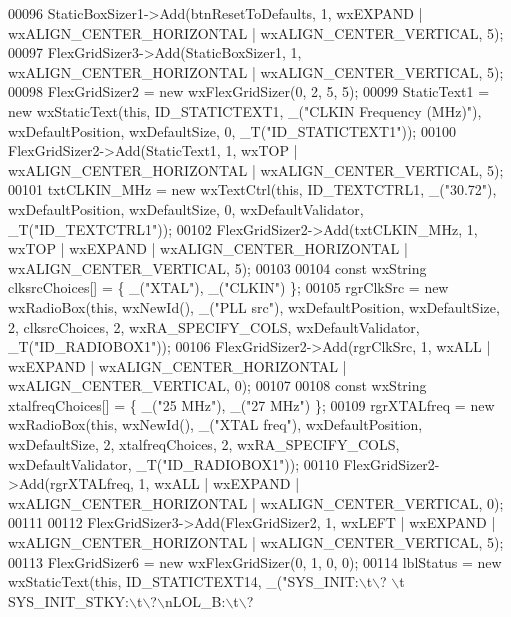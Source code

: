 \begin{DoxyCode}
00096     StaticBoxSizer1->Add(btnResetToDefaults, 1, wxEXPAND | wxALIGN\_CENTER\_HORIZONTAL | 
      wxALIGN\_CENTER\_VERTICAL, 5);
00097     FlexGridSizer3->Add(StaticBoxSizer1, 1, wxALIGN\_CENTER\_HORIZONTAL | wxALIGN\_CENTER\_VERTICAL, 5);
00098     FlexGridSizer2 = \textcolor{keyword}{new} wxFlexGridSizer(0, 2, 5, 5);
00099     StaticText1 = \textcolor{keyword}{new} wxStaticText(\textcolor{keyword}{this}, ID\_STATICTEXT1, \_(\textcolor{stringliteral}{"CLKIN Frequency (MHz)"}), wxDefaultPosition, 
      wxDefaultSize, 0, \_T(\textcolor{stringliteral}{"ID\_STATICTEXT1"}));
00100     FlexGridSizer2->Add(StaticText1, 1, wxTOP | wxALIGN\_CENTER\_HORIZONTAL | wxALIGN\_CENTER\_VERTICAL, 5);
00101     txtCLKIN\_MHz = \textcolor{keyword}{new} wxTextCtrl(\textcolor{keyword}{this}, ID\_TEXTCTRL1, \_(\textcolor{stringliteral}{"30.72"}), wxDefaultPosition, wxDefaultSize, 0, 
      wxDefaultValidator, \_T(\textcolor{stringliteral}{"ID\_TEXTCTRL1"}));
00102     FlexGridSizer2->Add(txtCLKIN\_MHz, 1, wxTOP | wxEXPAND | wxALIGN\_CENTER\_HORIZONTAL | 
      wxALIGN\_CENTER\_VERTICAL, 5);
00103 
00104     \textcolor{keyword}{const} wxString clksrcChoices[] = \{ \_(\textcolor{stringliteral}{"XTAL"}), \_(\textcolor{stringliteral}{"CLKIN"}) \};
00105     rgrClkSrc = \textcolor{keyword}{new} wxRadioBox(\textcolor{keyword}{this}, wxNewId(), \_(\textcolor{stringliteral}{"PLL src"}), wxDefaultPosition, wxDefaultSize, 2, 
      clksrcChoices, 2, wxRA\_SPECIFY\_COLS, wxDefaultValidator, \_T(\textcolor{stringliteral}{"ID\_RADIOBOX1"}));
00106     FlexGridSizer2->Add(rgrClkSrc, 1, wxALL | wxEXPAND | wxALIGN\_CENTER\_HORIZONTAL | 
      wxALIGN\_CENTER\_VERTICAL, 0);
00107 
00108     \textcolor{keyword}{const} wxString xtalfreqChoices[] = \{ \_(\textcolor{stringliteral}{"25 MHz"}), \_(\textcolor{stringliteral}{"27 MHz"}) \};
00109     rgrXTALfreq = \textcolor{keyword}{new} wxRadioBox(\textcolor{keyword}{this}, wxNewId(), \_(\textcolor{stringliteral}{"XTAL freq"}), wxDefaultPosition, wxDefaultSize, 2, 
      xtalfreqChoices, 2, wxRA\_SPECIFY\_COLS, wxDefaultValidator, \_T(\textcolor{stringliteral}{"ID\_RADIOBOX1"}));
00110     FlexGridSizer2->Add(rgrXTALfreq, 1, wxALL | wxEXPAND | wxALIGN\_CENTER\_HORIZONTAL | 
      wxALIGN\_CENTER\_VERTICAL, 0);
00111 
00112     FlexGridSizer3->Add(FlexGridSizer2, 1, wxLEFT | wxEXPAND | wxALIGN\_CENTER\_HORIZONTAL | 
      wxALIGN\_CENTER\_VERTICAL, 5);
00113     FlexGridSizer6 = \textcolor{keyword}{new} wxFlexGridSizer(0, 1, 0, 0);
00114     lblStatus = \textcolor{keyword}{new} wxStaticText(\textcolor{keyword}{this}, ID\_STATICTEXT14, \_(\textcolor{stringliteral}{"SYS\_INIT:\(\backslash\)t\(\backslash\)? \(\backslash\)t SYS\_INIT\_STKY:\(\backslash\)t\(\backslash\)?\(\backslash\)nLOL\_B:\(\backslash\)t\(\backslash\)? 
}
\end{DoxyCode}
